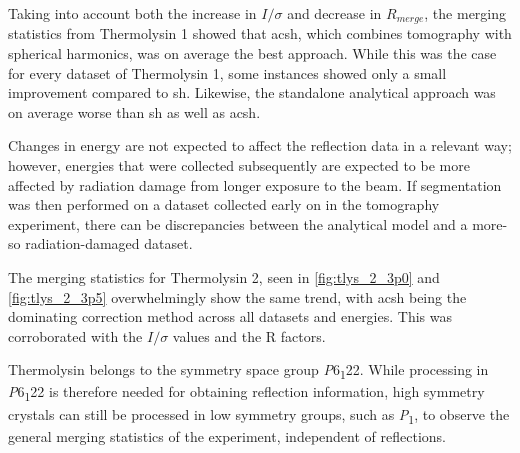 Taking into account both the increase in $I/\sigma$ and decrease in $R_{merge}$, the merging statistics from Thermolysin 1 showed that \ac{acsh}, which combines tomography with spherical harmonics, was on average the best approach. While this was the case for every dataset of Thermolysin 1, some instances showed only a small improvement compared to \ac{sh}. Likewise, the standalone analytical approach was on average worse than \ac{sh} as well as \ac{acsh}.

Changes in energy are not expected to affect the reflection data in a relevant way; however, energies that were collected subsequently are expected to be more affected by radiation damage from longer exposure to the beam. If segmentation was then performed on a dataset collected early on in the tomography experiment, there can be discrepancies between the analytical model and a more-so radiation-damaged dataset.


The merging statistics for Thermolysin 2, seen in \cref{fig:tlys_2_3p0} and \cref{fig:tlys_2_3p5} overwhelmingly show the same trend, with \ac{acsh} being the dominating correction method across all datasets and energies. This was corroborated with the $I/\sigma$ values and the R factors.

Thermolysin belongs to the symmetry space group \textit{P}6\textsubscript{1}22. While processing in \textit{P}6\textsubscript{1}22 is therefore needed for obtaining reflection information, high symmetry crystals can still be processed in low symmetry groups, such as \textit{P}\textsubscript{1}, to observe the general merging statistics of the experiment, independent of reflections.

